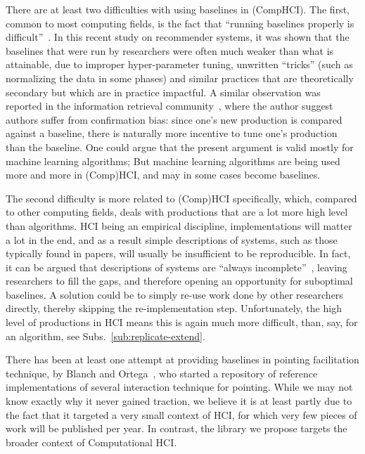 \documentclass[12pt,a4paper]{article}
\begin{document}
There are at least two difficulties with using baselines in (CompHCI). The first, common to most computing fields, is the fact that ``running baselines properly is difficult''~\cite{rendle2019}. In this recent study on recommender systems, it was shown that the baselines that were run by researchers were often much weaker than what is attainable, due to improper hyper-parameter tuning, unwritten ``tricks'' (such as normalizing the data in some phases) and similar practices that are theoretically secondary but which are in practice impactful. A similar observation was reported in the information retrieval community~\cite{lin2019}, where the author suggest authors suffer from confirmation bias: since one's new production is compared against a baseline, there is naturally more incentive to tune one's production than the baseline.
One could argue that the present argument is valid mostly for machine learning algorithms; But machine learning algorithms are being used more and more in (Comp)HCI, and may in some cases become baselines. 

The second difficulty is more related to (Comp)HCI specifically, which, compared to other computing fields, deals with productions that are a lot more high level than algorithms. HCI being an empirical discipline, implementations will matter a lot in the end, and  as a result simple descriptions of systems, such as those typically found in papers, will usually be insufficient to be reproducible. In fact, it can be argued that descriptions of systems are ``always incomplete''~\cite{greiffenhagen2013}, leaving researchers to fill the gaps, and therefore opening an opportunity for suboptimal baselines. 
A solution could be to simply re-use work done by other researchers directly, thereby skipping the re-implementation step. Unfortunately, the high level of productions in HCI means this is again much more difficult, than, say, for an algorithm, see Subs.~\ref{sub:replicate-extend}.

There has been at least one attempt at providing baselines in pointing facilitation technique, by Blanch and Ortega~\cite{blanch2011}, who started a repository of reference implementations of several interaction technique for pointing. While we may not know exactly why it never gained traction, we believe it is at least partly due to the fact that it targeted a very small context of HCI, for which very few pieces of work will be published per year. In contrast, the library we propose targets the broader context of Computational HCI.
 
\end{document}
